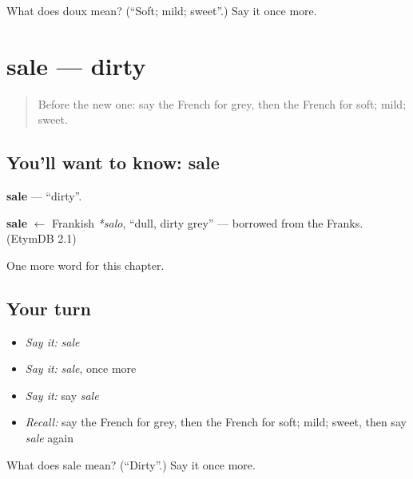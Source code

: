 \begin{tcolorbox}[breakable,colback=teal!4,colframe=teal!35!black,title={Before you move on}]
What does doux mean? (\textquotedblleft{}Soft; mild; sweet\textquotedblright{}.) Say it once more.
\end{tcolorbox}
\section[sale]{sale — dirty}

\label{lesson:FR-C92-sale}



\begin{quote}
Before the new one: say the French for grey, then the French for soft; mild; sweet.
\end{quote}

\subsection*{You'll want to know: sale}
\textbf{sale} — \textquotedblleft{}dirty\textquotedblright{}.

\begin{cousinweb}
\textbf{sale} $\leftarrow$ Frankish \emph{*salo}, \textquotedblleft{}dull, dirty grey\textquotedblright{} — borrowed from the Franks. (EtymDB 2.1)
\end{cousinweb}

\begin{grammarlens}[title={What you've built}]
One more word for this chapter.
\end{grammarlens}

\subsection*{Your turn}
\begin{itemize}
\raggedright
  \item \emph{Say it:} \emph{sale}
  \item \emph{Say it:} \emph{sale}, once more
  \item \emph{Say it:} say \emph{sale}
  \item \emph{Recall:} say the French for grey, then the French for soft; mild; sweet, then say \emph{sale} again
\end{itemize}

\begin{tcolorbox}[breakable,colback=teal!4,colframe=teal!35!black,title={Before you move on}]
What does sale mean? (\textquotedblleft{}Dirty\textquotedblright{}.) Say it once more.
\end{tcolorbox}
